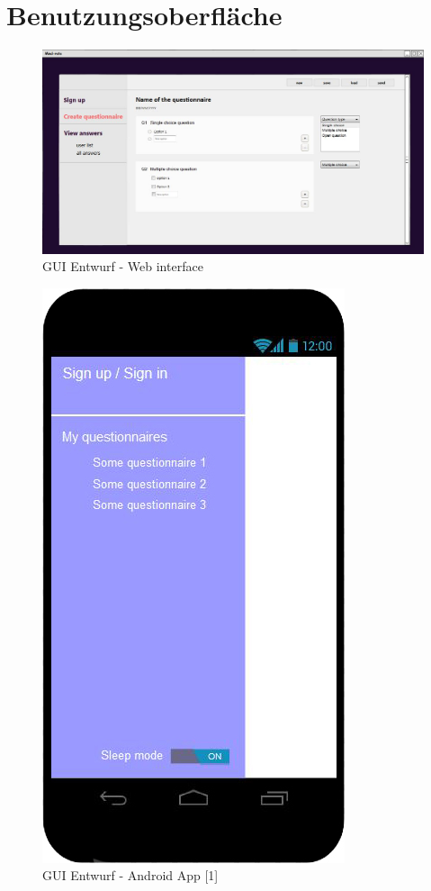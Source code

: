 \documentclass[a4paper]{scrreprt}
\begin{document}
    \chapter{Benutzungsoberfläche}
 
        \begin{figure}[ht]
            \centering
            \includegraphics[scale = 0.4]{web.jpg}
            \caption{GUI Entwurf - Web interface}
        \end{figure}
	
	\begin{figure}[ht]
            \centering
            \includegraphics[scale = 0.3]{android1.jpg}
            \caption{GUI Entwurf - Android App [1]}
        \end{figure}
	
\end{document}
